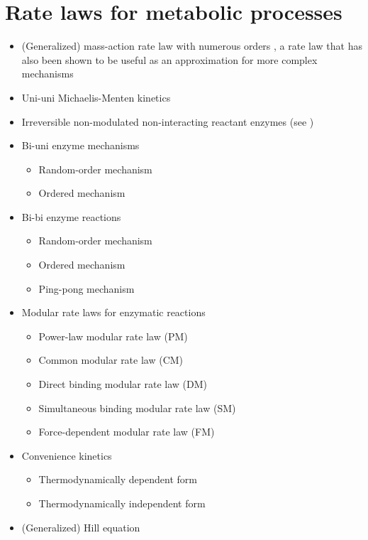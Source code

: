 \section{Rate laws for metabolic processes}
\begin{itemize}
  \item (Generalized) mass-action rate law with numerous orders \citep[p.~16]{Guldberg1879, Heinrich1996},
        a rate law that has also been shown to be useful as an approximation for more complex mechanisms
        \citep{Draeger2007a, Draeger2009a}
  \item Uni-uni Michaelis-Menten kinetics \citep{Michaelis1913}
  \item Irreversible non-modulated non-interacting reactant enzymes (see \SBO)
  \item Bi-uni enzyme mechanisms \citep{Segel1993, Bisswanger2000, Cornish-Bowden2004}
  \begin{itemize}
    \item Random-order mechanism
    \item Ordered mechanism
  \end{itemize}
  \item Bi-bi enzyme reactions \citep{Segel1993, Bisswanger2000, Cornish-Bowden2004}
  \begin{itemize}
    \item Random-order mechanism \citep[p.~169]{Cornish-Bowden2004}
    \item Ordered mechanism
    \item Ping-pong mechanism
  \end{itemize}
  \item Modular rate laws for enzymatic reactions \citep{Liebermeister2010}
  \begin{itemize}
    \item Power-law modular rate law (PM)
    \item Common modular rate law (CM)
    \item Direct binding modular rate law (DM)
    \item Simultaneous binding modular rate law (SM)
    \item Force-dependent modular rate law (FM)
  \end{itemize}
  \item Convenience kinetics \citep{Liebermeister2006}
  \begin{itemize}
    \item Thermodynamically dependent form
    \item Thermodynamically independent form
  \end{itemize}
  \item (Generalized) Hill equation \citep[p.~314]{Hill1910, Cornish-Bowden2004}
\end{itemize}

